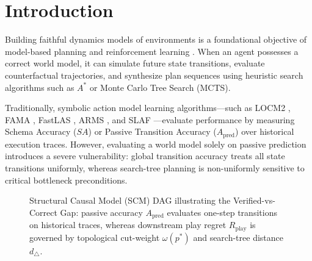 \documentclass[preprint,12pt,3p]{elsarticle}
\begin{document}
\section{Introduction}
Building faithful dynamics models of environments is a foundational objective of model-based planning and reinforcement learning \cite{Aineto2019AIJ, Lambert2020CoRL}. When an agent possesses a correct world model, it can simulate future state transitions, evaluate counterfactual trajectories, and synthesize plan sequences using heuristic search algorithms such as $A^*$ or Monte Carlo Tree Search (MCTS).

Traditionally, symbolic action model learning algorithms---such as LOCM2 \cite{Cresswell2011ICAPS}, FAMA \cite{Aineto2019AIJ}, FastLAS \cite{Law2020AAAI}, ARMS \cite{Yang2007IJCAI}, and SLAF \cite{Amir2008AAAI, Amir2008JAIR}---evaluate performance by measuring Schema Accuracy ($SA$) or Passive Transition Accuracy ($A_{\text{pred}}$) over historical execution traces. However, evaluating a world model solely on passive prediction introduces a severe vulnerability: global transition accuracy treats all state transitions uniformly, whereas search-tree planning is non-uniformly sensitive to critical bottleneck preconditions.

\begin{figure}[htbp]
\centering
{}
\caption{Structural Causal Model (SCM) DAG illustrating the Verified-vs-Correct Gap: passive accuracy $A_{\text{pred}}$ evaluates one-step transitions on historical traces, whereas downstream play regret $R_{\text{play}}$ is governed by topological cut-weight $\omega(p^*)$ and search-tree distance $d_\triangle$.}
\label{fig:scm_dag}
\end{figure}
\end{document}
